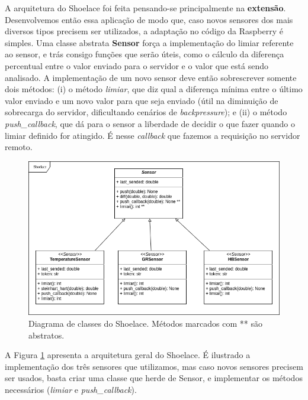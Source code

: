 A arquitetura do Shoelace foi feita pensando-se principalmente na
\textbf{extensão}. Desenvolvemos então essa aplicação de modo que, caso novos
sensores dos mais diversos tipos precisem ser utilizados, a adaptação no código
da Raspberry é simples. Uma classe abstrata \textbf{Sensor} força a implementação
do limiar referente ao sensor, e trás consigo funções que serão úteis, como o
cálculo da diferença percentual entre o valor enviado para o servidor e o valor
que está sendo analisado. A implementação de um novo sensor deve então
sobrescrever somente dois métodos: (i) o método \textit{limiar}, que diz qual a
diferença mínima entre o último valor enviado e um novo valor para que seja
enviado (útil na diminuição de sobrecarga do servidor, dificultando cenários de
\textit{backpressure}); e (ii) o método \textit{push\_callback}, que dá para o
sensor a liberdade de decidir o que fazer quando o limiar definido for atingido.
É nesse \textit{callback} que fazemos a requisição no servidor remoto.

\begin{figure}
    \begin{center}
        \includegraphics[scale=0.5]{figuras/shoelace.png}
    \end{center}
    \caption{Diagrama de classes do Shoelace. Métodos marcados com ** são
    abstratos.}
    \label{fig:shoelace}
\end{figure}

A Figura \ref{fig:shoelace} apresenta a arquitetura geral do Shoelace. É
ilustrado a implementação dos três sensores que utilizamos, mas caso novos
sensores precisem ser usados, basta criar uma classe que herde de Sensor, e
implementar os métodos necessários (\textit{limiar} e \textit{push\_callback}).
